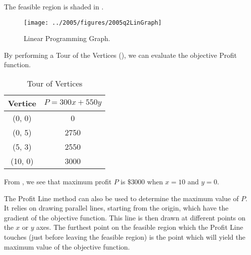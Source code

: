 \begin{subquestions}
\subquestion

The feasible region is shaded in .
\begin{figure}[h]
	\begin{center}
		\texttt{[image: ../2005/figures/2005q2LinGraph]}
		\caption{\label{2005:q2:fig:LinGraph} Linear Programming Graph.}
	\end{center}
\end{figure}

\subquestion

By performing a Tour of the Vertices (), we can evaluate the objective Profit function.

\begin{table}[H]
	\centering
	\begin{tabular}{|c|c|}
		\hline
		Vertice & $P = 300x + 550y$ \\
		\hline
		(0, 0) & 0 \\
		(0, 5) & 2750 \\
		(5, 3) & 2550 \\
		(10, 0) & 3000 \\
		\hline
	\end{tabular}
	\caption{\label{2005:q2:tab:Profit} Tour of Vertices}
\end{table}

From , we see that maximum profit $P$ is $ \$ 3000$ when $x = 10$ and $y = 0$.


\subquestion

The Profit Line method can also be used to determine the maximum value of $P$. It relies on drawing parallel lines, starting from the origin, which have the gradient of the objective function. This line is then drawn at different points on the $x$ or $y$ axes. The furthest point on the feasible region which the Profit Line touches (just before leaving the feasible region) is the point which will yield the maximum value of the objective function. 

\end{subquestions}

